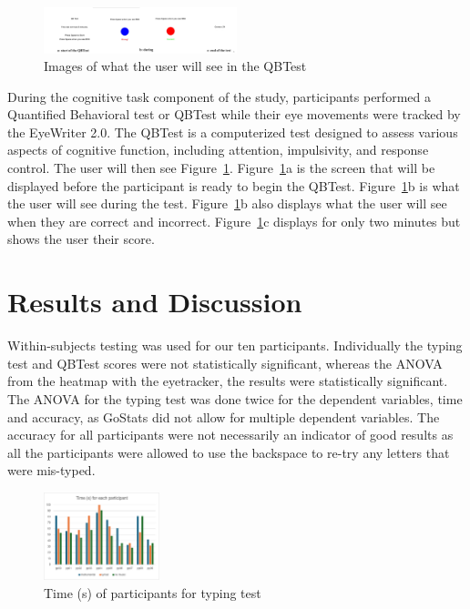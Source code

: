 \documentclass[manuscript, screen, review]{acmart} %
\begin{document}
\begin{figure}
  \includegraphics[width=0.5\textwidth]{qbTest.png}
  \caption{Images of what the user will see in the QBTest}
  \label{QBTest}
\end{figure}

During the cognitive task component of the study, participants performed a Quantified Behavioral test or QBTest while their eye movements were tracked by the EyeWriter 2.0.
The QBTest is a computerized test designed to assess various aspects of cognitive function, including attention, impulsivity, and response control.
The user will then see Figure~\ref{QBTest}. Figure~\ref{QBTest}a is the screen that will be displayed before the participant is ready to begin the QBTest.
Figure~\ref{QBTest}b is what the user will see during the test. Figure~\ref{QBTest}b also displays what the user will see when they are correct and incorrect.
Figure~\ref{QBTest}c displays for only two minutes but shows the user their score.

\section{Results and Discussion}
Within-subjects testing was used for our ten participants. Individually the typing test and QBTest scores were not statistically significant, whereas 
the ANOVA from the heatmap with the eyetracker, the results were statistically significant. %
The ANOVA for the typing test was done twice for the dependent variables, time and accuracy, as GoStats did not allow for multiple 
dependent variables. The accuracy for all participants were not necessarily an indicator of good results as all the participants were 
allowed to use the backspace to re-try any letters that were mis-typed.

\begin{figure}
  \includegraphics[width=0.3\textwidth]{time}
  \caption{Time (s) of participants for typing test}
  \label{timeL}
\end{figure}
\end{document}
